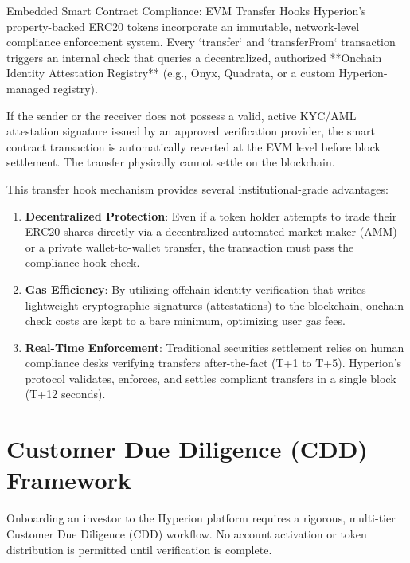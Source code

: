 \documentclass[11pt]{article}
\begin{document}
\begin{regulatorybox}{Embedded Smart Contract Compliance: EVM Transfer Hooks}
Hyperion's property-backed ERC20 tokens incorporate an immutable, network-level compliance enforcement system. Every `transfer` and `transferFrom` transaction triggers an internal check that queries a decentralized, authorized **Onchain Identity Attestation Registry** (e.g., Onyx, Quadrata, or a custom Hyperion-managed registry). 

If the sender or the receiver does not possess a valid, active KYC/AML attestation signature issued by an approved verification provider, the smart contract transaction is automatically reverted at the EVM level before block settlement. The transfer physically cannot settle on the blockchain.
\end{regulatorybox}

This transfer hook mechanism provides several institutional-grade advantages:
\begin{enumerate}
    \item \textbf{Decentralized Protection}: Even if a token holder attempts to trade their ERC20 shares directly via a decentralized automated market maker (AMM) or a private wallet-to-wallet transfer, the transaction must pass the compliance hook check.
    \item \textbf{Gas Efficiency}: By utilizing offchain identity verification that writes lightweight cryptographic signatures (attestations) to the blockchain, onchain check costs are kept to a bare minimum, optimizing user gas fees.
    \item \textbf{Real-Time Enforcement}: Traditional securities settlement relies on human compliance desks verifying transfers after-the-fact (T+1 to T+5). Hyperion's protocol validates, enforces, and settles compliant transfers in a single block (T+12 seconds).
\end{enumerate}

\section{Customer Due Diligence (CDD) Framework}
Onboarding an investor to the Hyperion platform requires a rigorous, multi-tier Customer Due Diligence (CDD) workflow. No account activation or token distribution is permitted until verification is complete.
\end{document}
